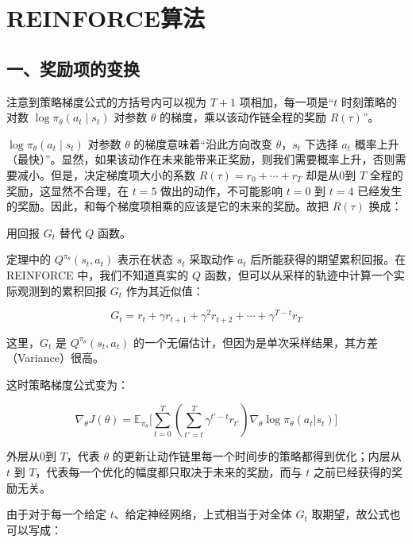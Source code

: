 \setcounter{section}{1}

\hypertarget{reinforceux7b97ux6cd5}{%
\section{REINFORCE算法}\label{reinforceux7b97ux6cd5}}

\hypertarget{ux4e00ux5956ux52b1ux9879ux7684ux53d8ux6362}{%
\subsection{一、奖励项的变换}\label{ux4e00ux5956ux52b1ux9879ux7684ux53d8ux6362}}

注意到策略梯度公式的方括号内可以视为 \(T+1\) 项相加，每一项是``\(t\) 时刻策略的对数 \(\log\pi_\theta(a_t\mid s_t)\) 对参数 \(\theta\) 的梯度，乘以该动作链全程的奖励 \(R(\tau)\)''。

\(\log\pi_\theta(a_t\mid s_t)\) 对参数 \(\theta\) 的梯度意味着``沿此方向改变 \(\theta\)，\(s_t\) 下选择 \(a_t\) 概率上升（最快）''。显然，如果该动作在未来能带来正奖励，则我们需要概率上升，否则需要减小。但是，决定梯度项大小的系数 \(R(\tau)=r_0+\cdots+r_T\) 却是从0到 \(T\) 全程的奖励，这显然不合理，在 \(t=5\) 做出的动作，不可能影响 \(t=0\) 到 \(t=4\) 已经发生的奖励。因此，和每个梯度项相乘的应该是它的未来的奖励。故把 \(R(\tau)\) 换成：

用回报 \(G_t\) 替代 \(Q\) 函数。

定理中的 \(Q^{\pi_\theta}(s_t,a_t)\) 表示在状态 \(s_t\) 采取动作 \(a_t\) 后所能获得的期望累积回报。在 REINFORCE 中，我们不知道真实的 \(Q\) 函数，但可以从采样的轨迹中计算一个实际观测到的累积回报 \(G_t\) 作为其近似值：

\[
G_t=r_t+\gamma r_{t+1}+\gamma^{2}r_{t+2}+\cdots+\gamma^{T-t}r_T
\]

这里，\(G_t\) 是 \(Q^{\pi_\theta}(s_t,a_t)\) 的一个无偏估计，但因为是单次采样结果，其方差（Variance）很高。

这时策略梯度公式变为：

\[
\nabla_\theta J(\theta)
=\mathbb{E}_{\pi_\theta}
\bigl[
\sum_{t=0}^{T}
(\sum_{t'=t}^{T}\gamma^{t'-t}r_{t'})
\nabla_\theta\log\pi_\theta(a_t|s_t)
\bigr]
\]

外层从0到 \(T\)，代表 \(\theta\) 的更新让动作链里每一个时间步的策略都得到优化；内层从 \(t\) 到 \(T\)，代表每一个优化的幅度都只取决于未来的奖励，而与 \(t\) 之前已经获得的奖励无关。

由于对于每一个给定 \(t\)、给定神经网络，上式相当于对全体 \(G_t\) 取期望，故公式也可以写成：

